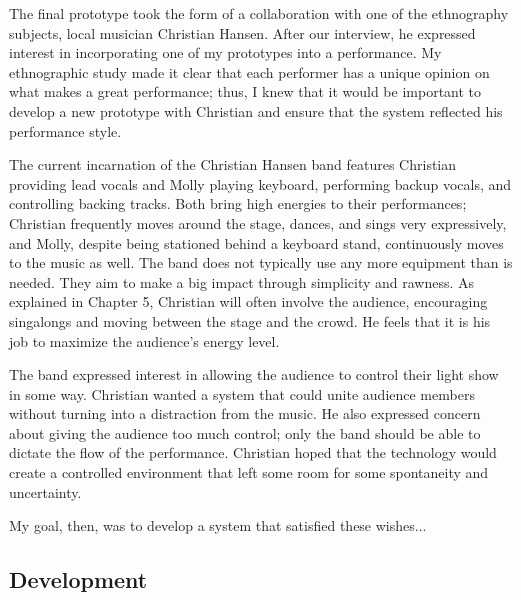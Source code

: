 The final prototype took the form of a collaboration with one of the ethnography subjects, local musician Christian Hansen. After our interview, he expressed interest in incorporating one of my prototypes into a performance. My ethnographic study made it clear that each performer has a unique opinion on what makes a great performance; thus, I knew that it would be important to develop a new prototype with Christian and ensure that the system reflected his performance style.

The current incarnation of the Christian Hansen band features Christian providing lead vocals and Molly playing keyboard, performing backup vocals, and controlling backing tracks. Both bring high energies to their performances; Christian frequently moves around the stage, dances, and sings very expressively, and Molly, despite being stationed behind a keyboard stand, continuously moves to the music as well. The band does not typically use any more equipment than is needed. They aim to make a big impact through simplicity and rawness. As explained in Chapter 5, Christian will often involve the audience, encouraging singalongs and moving between the stage and the crowd. He feels that it is his job to maximize the audience's energy level.

The band expressed interest in allowing the audience to control their light show in some way. Christian wanted a system that could unite audience members without turning into a distraction from the music. He also expressed concern about giving the audience too much control; only the band should be able to dictate the flow of the performance. Christian hoped that the technology would create a controlled environment that left some room for some spontaneity and uncertainty.

My goal, then, was to develop a system that satisfied these wishes...

\subsection{Development}

